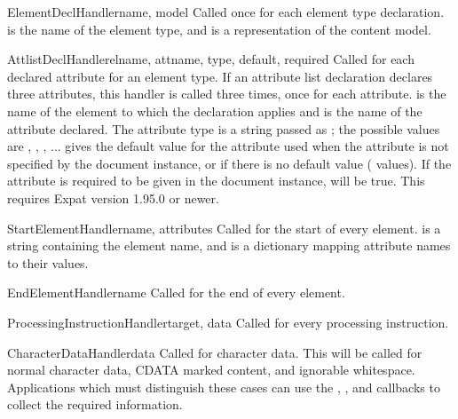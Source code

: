 \begin{methoddesc}[xmlparser]{ElementDeclHandler}{name, model}
Called once for each element type declaration.   is the name
of the element type, and  is a representation of the
content model.
\end{methoddesc}

\begin{methoddesc}[xmlparser]{AttlistDeclHandler}{elname, attname,
                                                  type, default, required}
Called for each declared attribute for an element type.  If an
attribute list declaration declares three attributes, this handler is
called three times, once for each attribute.   is the name
of the element to which the declaration applies and  is
the name of the attribute declared.  The attribute type is a string
passed as ; the possible values are ,
, , ...
 gives the default value for the attribute used when the
attribute is not specified by the document instance, or  if
there is no default value ( values).  If the attribute
is required to be given in the document instance,  will
be true.
This requires Expat version 1.95.0 or newer.
\end{methoddesc}

\begin{methoddesc}[xmlparser]{StartElementHandler}{name, attributes}
Called for the start of every element.   is a string
containing the element name, and  is a dictionary
mapping attribute names to their values.
\end{methoddesc}

\begin{methoddesc}[xmlparser]{EndElementHandler}{name}
Called for the end of every element.
\end{methoddesc}

\begin{methoddesc}[xmlparser]{ProcessingInstructionHandler}{target, data}
Called for every processing instruction.
\end{methoddesc}

\begin{methoddesc}[xmlparser]{CharacterDataHandler}{data}
Called for character data.  This will be called for normal character
data, CDATA marked content, and ignorable whitespace.  Applications
which must distinguish these cases can use the
, ,
and  callbacks to collect the required
information.
\end{methoddesc}

